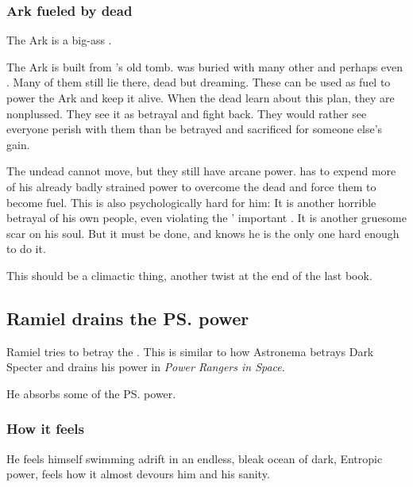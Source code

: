 \subsubsection{Ark fueled by dead \ophidians}
The Ark is a big-ass . 

The Ark is built from \Sethicus's old tomb. 
\Sethicus was buried with many other \ophidians and perhaps even \dragons.
Many of them still lie there, dead but dreaming. 
These can be used as fuel to power the Ark and keep it alive. 
When the dead learn about this plan, they are nonplussed. 
They see it as betrayal and fight back. 
They would rather see everyone perish with them than be betrayed and sacrificed for someone else's gain. 

The undead cannot move, but they still have arcane power. 
\Ishnaruchaefir has to expend more of his already badly strained power to overcome the dead and force them to become fuel. 
This is also psychologically hard for him: 
It is another horrible betrayal of his own people, even violating the \dragons' important . 
It is another gruesome scar on his soul. 
But it must be done, and \Ishnaruchaefir knows he is the only one hard enough to do it. 

This should be a climactic thing, another  twist at the end of the last book. 









\subsection{Ramiel drains the \ps{\Voidbringer}{} power}
Ramiel tries to betray the \Voidbringer. 
This is similar to how Astronema betrays Dark Specter and drains his power in \emph{Power Rangers in Space}. 

He absorbs some of the \ps{\Voidbringer}{} power. 





\subsubsection{How it feels}
He feels himself swimming adrift in an endless, bleak ocean of dark, Entropic power, feels how it almost devours him and his sanity.

